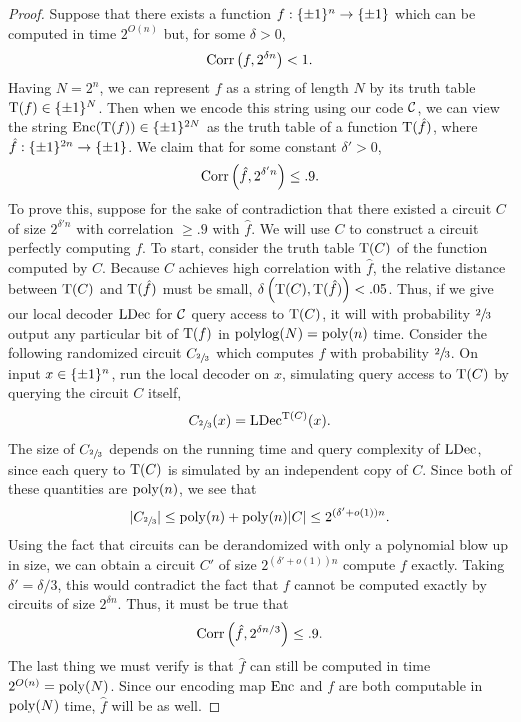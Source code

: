 \documentclass[11pt]{article}
\begin{document}
\begin{proof}

    Suppose that there exists a function $f : \{\pm 1\}^n \rightarrow \{\pm 1\}$ which can be computed in time $2^{O(n)}$ but, for some $\delta > 0$, 
    \begin{equation*}
        \mathrm{Corr}\left(f, 2^{\delta n}\right) < 1.
    \end{equation*}
    Having $N = 2^n$, we can represent $f$ as a string of length $N$ by its truth table $\mathrm{T}(f) \in \{\pm 1\}^N$. Then when we encode this string using our code $\mathcal{C}$, we can view the string $\mathrm{Enc}(\mathrm{T}(f)) \in \{\pm 1\}^{2N}$ as the truth table of a function $\mathrm{T}(\hat{f})$, where $\hat{f} : \{\pm 1\}^{2n} \rightarrow \{\pm 1\}$. We claim that for some constant $\delta' > 0$,
    \begin{equation*}
        \mathrm{Corr}\left(\hat{f}, 2^{\delta' n}\right) \leq .9.
    \end{equation*}
    To prove this, suppose for the sake of contradiction that there existed a circuit $C$ of size $2^{\delta' n}$ with correlation $\geq .9$ with $\hat{f}$. We will use $C$ to construct a circuit perfectly computing $f$. To start, consider the truth table $\mathrm{T}(C)$ of the function computed by $C$. Because $C$ achieves high correlation with $\hat{f}$, the relative distance between $\mathrm{T}(C)$ and $\mathrm{T}(\hat{f})$ must be small, $\delta\left(\mathrm{T}(C), \mathrm{T}(\hat{f})\right) < .05$. Thus, if we give our local decoder ${\textup{LDec}}$ for $\mathcal{C}$ query access to $\mathrm{T}(C)$, it will with probability $\sfrac{2}{3}$ output any particular bit of $\mathrm{T}(f)$ in $\mathrm{polylog}(N) = \mathrm{poly}(n)$ time. Consider the following randomized circuit $C_{\sfrac{2}{3}}$ which computes $f$ with probability $\sfrac{2}{3}$. On input $x \in \{\pm 1\}^n$, run the local decoder on $x$, simulating query access to $\mathrm{T}(C)$ by querying the circuit $C$ itself,
    \begin{equation*}
        C_{\sfrac{2}{3}}(x) = {\textup{LDec}}^{\mathrm{T}(C)}(x).
    \end{equation*}
    The size of $C_{\sfrac{2}{3}}$ depends on the running time and query complexity of ${\textup{LDec}}$, since each query to $\mathrm{T}(C)$ is simulated by an independent copy of $C$. Since both of these quantities are $\mathrm{poly}(n)$, we see that 
    \begin{equation*}
        |C_{\sfrac{2}{3}}|  \leq \mathrm{poly}(n) + \mathrm{poly}(n) |C| \leq 2^{(\delta' + o(1))n}.
    \end{equation*}
    Using the fact that circuits can be derandomized with only a polynomial blow up in size, we can obtain a circuit $C'$ of size $2^{(\delta' + o(1))n}$ compute $f$ exactly. Taking $\delta' = \delta / 3$, this would contradict the fact that $f$ cannot be computed exactly by circuits of size $2^{\delta n}$. Thus, it must be true that 
    \begin{equation*}
        \mathrm{Corr}\left(\hat{f}, 2^{\delta n / 3}\right) \leq .9.
    \end{equation*}
    The last thing we must verify is that $\hat{f}$ can still be computed in time $2^{O(n)} = \mathrm{poly}(N)$. Since our encoding map $\mathrm{Enc}$ and $f$ are both computable in $\mathrm{poly}(N)$ time, $\hat{f}$ will be as well.
\end{proof}
\end{document}
